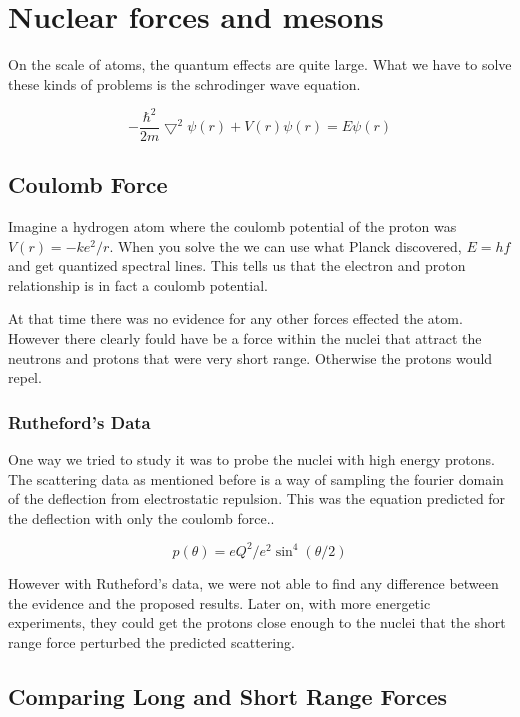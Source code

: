 \documentclass[english, 11pt]{article}
\begin{document}
      \section{Nuclear forces and mesons}

      On the scale of atoms, the quantum effects are quite large. What we have to solve these kinds of problems is the schrodinger wave equation.

      \begin{defn}\label{swe}
        \[ -\frac{\hbar^2}{2m}\bigtriangledown^2\psi(r) + V(r)\psi(r) = E\psi(r) \]
      \end{defn}

      \subsection{Coulomb Force}

        Imagine a hydrogen atom where the coulomb potential of the proton was $V(r) = -ke^2/r$. When you solve the  we can use what Planck discovered, $E=hf$ and get quantized spectral lines. This tells us that the electron and proton relationship is in fact a coulomb potential.

        At that time there was no evidence for any other forces effected the atom. However there clearly fould have be a force within the nuclei that attract the neutrons and protons that were very short range. Otherwise the protons would repel. 

      \subsubsection{Rutheford's Data}
        One way we tried to study it was to probe the nuclei with high energy protons. The scattering data as mentioned before is a way of sampling the fourier domain of the deflection from electrostatic repulsion. This was the equation predicted for the deflection with only the coulomb force..

          \[ p(\theta) = eQ^2 / e^2\sin^4(\theta/2) \]

        However with Rutheford's data, we were not able to find any difference between the evidence and the proposed results. Later on, with more energetic experiments, they could get the protons close enough to the nuclei that the short range force perturbed the predicted scattering.

      \subsection{Comparing Long and Short Range Forces}
\end{document}
